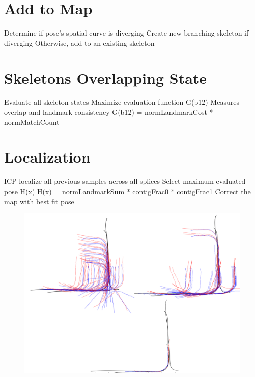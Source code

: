 \section{Add to Map}
\label{addtomap}

Determine if pose’s spatial curve is diverging
Create new branching skeleton if diverging
Otherwise, add to an existing skeleton

\section{Skeletons Overlapping State}
\label{skeletonsoverlappingstate}

Evaluate all skeleton states
Maximize evaluation function G(b12)
Measures overlap and landmark consistency
G(b12) = normLandmarkCost * normMatchCount

\section{Localization}
\label{localization}

ICP localize all previous samples across all splices
Select maximum evaluated pose H(x)
H(x) = normLandmarkSum * contigFrac0 * contigFrac1
Correct the map with best fit pose

\begin{figure}[htbp]
\centering
\includegraphics[keepaspectratio,width=\textwidth,height=0.75\textheight]{PastedGraphic11.pdf}
\label{pastedgraphic11.pdf}
\end{figure}



